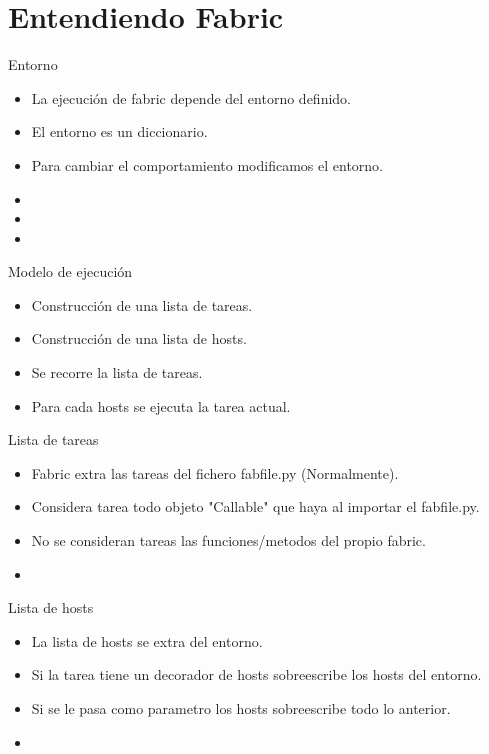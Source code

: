 \documentclass[10pt]{beamer}
\begin{document}
  \section*{Entendiendo Fabric}
  \begin{frame}{Entorno}
    \begin{itemize}
      \item La ejecución de fabric depende del entorno definido.
      \item El entorno es un diccionario.
      \item Para cambiar el comportamiento modificamos el entorno.
      \item 
      \item 
      \item 
    \end{itemize}
  \end{frame}

  \begin{frame}{Modelo de ejecución}
    \begin{itemize}
      \item Construcción de una lista de tareas.
      \item Construcción de una lista de hosts.
      \item Se recorre la lista de tareas.
      \item Para cada hosts se ejecuta la tarea actual.
    \end{itemize}
  \end{frame}

  \begin{frame}{Lista de tareas}
    \begin{itemize}
      \item Fabric extra las tareas del fichero fabfile.py (Normalmente).
      \item Considera tarea todo objeto "Callable" que haya al importar el fabfile.py.
      \item No se consideran tareas las funciones/metodos del propio fabric.
      \item 
    \end{itemize}
  \end{frame}

  \begin{frame}{Lista de hosts}
    \begin{itemize}
      \item La lista de hosts se extra del entorno.
      \item Si la tarea tiene un decorador de hosts sobreescribe los hosts del entorno.
      \item Si se le pasa como parametro los hosts sobreescribe todo lo anterior.
      \item 
    \end{itemize}
  \end{frame}
\end{document}
